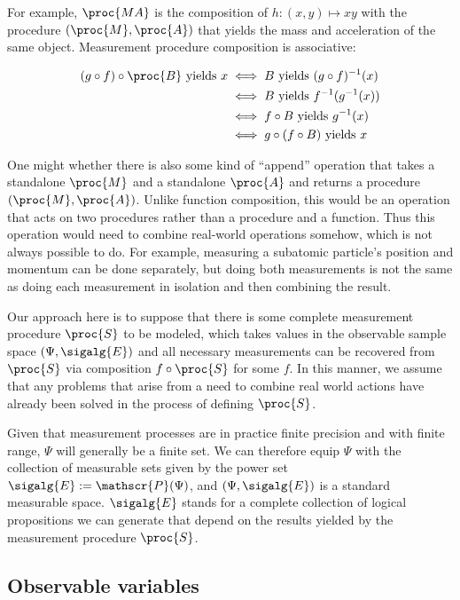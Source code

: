 For example, $\proc{MA}$ is the composition of $h:(x,y)\mapsto xy$ with the procedure $(\proc{M},\proc{A})$ that yields the mass and acceleration of the same object. Measurement procedure composition is associative:

\begin{align}
    (g\circ f)\circ\proc{B}\text{ yields } x &\iff B\text{ yields } (g\circ f)^{-1}(x) \\
    &\iff B\text{ yields } f^{-1}(g^{-1}(x))\\
    &\iff f\circ B \text{ yields } g^{-1}(x)\\
    &\iff g\circ(f\circ B)\text{ yields } x
\end{align}


One might whether there is also some kind of ``append'' operation that takes a standalone $\proc{M}$ and a standalone $\proc{A}$ and returns a procedure $(\proc{M},\proc{A})$. Unlike function composition, this would be an operation that acts on two procedures rather than a procedure and a function. Thus this operation would need to combine real-world operations somehow, which is not always possible to do. For example, measuring a subatomic particle's position and momentum can be done separately, but doing both measurements is not the same as doing each measurement in isolation and then combining the result. 

Our approach here is to suppose that there is some complete measurement procedure $\proc{S}$ to be modeled, which takes values in the observable sample space $(\Psi,\sigalg{E})$ and all necessary measurements can be recovered from $\proc{S}$ via composition $f\circ \proc{S}$ for some $f$. In this manner, we assume that any problems that arise from a need to combine real world actions have already been solved in the process of defining $\proc{S}$.

Given that measurement processes are in practice finite precision and with finite range, $\Psi$ will generally be a finite set. We can therefore equip $\Psi$ with the collection of measurable sets given by the power set $\sigalg{E}:=\mathscr{P}(\Psi)$, and $(\Psi,\sigalg{E})$ is a standard measurable space. $\sigalg{E}$ stands for a complete collection of logical propositions we can generate that depend on the results yielded by the measurement procedure $\proc{S}$.

\subsection{Observable variables}

